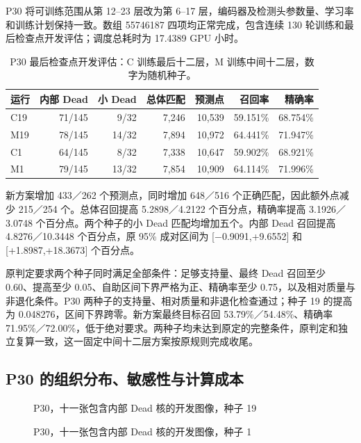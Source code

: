 \documentclass[
  11pt,
  fontset=fandol]{ctexart}
\begin{document}
P30 将可训练范围从第 12--23 层改为第 6--17
层，编码器及检测头参数量、学习率和训练计划保持一致。数组 55746187
四项均正常完成，包含连续 130 轮训练和最后检查点开发评估；调度总耗时为
17.4389 GPU 小时。

\begin{table}[H]\centering\small
\begin{tabular}{lrrrrrr}\hline
运行 & 内部 Dead & 小 Dead & 总体匹配 & 预测点 & 召回率 & 精确率 \\\hline
C19 & 71/145 & 9/32 & 7,246 & 10,539 & 59.151\% & 68.754\% \\
M19 & 78/145 & 14/32 & 7,894 & 10,972 & 64.441\% & 71.947\% \\
C1 & 64/145 & 8/32 & 7,338 & 10,647 & 59.902\% & 68.921\% \\
M1 & 79/145 & 13/32 & 7,854 & 10,909 & 64.114\% & 71.996\% \\
\hline\end{tabular}
\caption{P30 最后检查点开发评估：C 训练最后十二层，M 训练中间十二层，数字为随机种子。}
\end{table}

新方案增加 433／262 个预测点，同时增加 648／516
个正确匹配，因此额外点减少 215／254 个。总体召回提高 5.2898／4.2122
个百分点，精确率提高 3.1926／3.0748 个百分点。两个种子的小 Dead
匹配均增加五个。内部 Dead 召回提高 4.8276／10.3448 个百分点，原 95\%
成对区间为 {[}−0.9091,+9.6552{]} 和 {[}+1.8987,+18.3673{]} 个百分点。

原判定要求两个种子同时满足全部条件：足够支持量、最终 Dead 召回至少
0.60、提高至少 0.05、自助区间下界严格为正、精确率至少
0.75，以及相对质量与非退化条件。P30
两种子的支持量、相对质量和非退化检查通过；种子 19 的提高为
0.048276，区间下界跨零。新方案最终目标召回 53.79\%／54.48\%、精确率
71.95\%／72.00\%，低于绝对要求。两种子均未达到原定的完整条件，原判定和独立复算一致，这一固定中间十二层方案按原规则完成收尾。

\subsection{P30
的组织分布、敏感性与计算成本}\label{p30-ux7684ux7ec4ux7ec7ux5206ux5e03ux654fux611fux6027ux4e0eux8ba1ux7b97ux6210ux672c}

\begin{figure}[H]\centering

\caption{P30，十一张包含内部 Dead 核的开发图像，种子 19}
\end{figure}

\begin{figure}[H]\centering

\caption{P30，十一张包含内部 Dead 核的开发图像，种子 1}
\end{figure}
\end{document}
